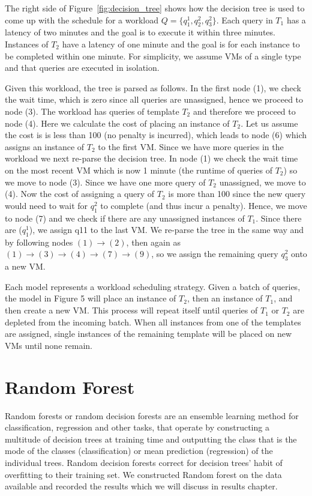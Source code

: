 The right side of Figure~\ref{fig:decision_tree} shows how the decision tree is used to come up with the schedule for a workload \(Q = \{q^1_1, q^2_2, q^2_3\}\). Each query in \(T_1\) has a latency of two minutes and the goal is to execute it within three minutes. Instances of \(T_2\) have a latency of one minute and the goal is for each instance to be completed within one minute. For simplicity, we assume VMs of a single type and that queries are executed in isolation. 

Given this workload, the tree is parsed as follows. In the first node (1), we check the wait time, which is zero since all queries are unassigned, hence we proceed to node (3). The workload has queries of template \(T_2\) and therefore we proceed to node (4). Here we calculate the cost of placing an instance of \(T_2\). Let us assume the cost is is less than 100 (no penalty is incurred), which leads to node (6) which assigns an instance of \(T_2\) to the first VM. Since we have more queries in the workload we next re-parse the decision tree. In node (1) we check the wait time on the most recent VM which is now 1 minute (the runtime of queries of \(T_2\)) so we move to node (3). Since we have one more query of \(T_2\) unassigned, we move to (4). Now the cost of assigning a query of \(T_2\) is more than 100 since the new query would need to wait for \(q^2_1\) to complete (and thus incur a penalty). Hence, we move to node (7) and we check if there are any unassigned instances of \(T_1\). Since there are (\(q^1_1\)), we assign q11 to the last VM. We re-parse the tree in the same way and by following nodes \((1)\to(2)\), then again as \((1)\to(3)\to(4)\to(7)\to(9)\), so we assign the remaining query \(q^2_3\) onto a new VM. 

Each model represents a workload scheduling strategy. Given a batch of queries, the model in Figure 5 will place an instance of \(T_2\), then an instance of \(T_1\), and then create a new VM. This process will repeat itself until queries of \(T_1\) or \(T_2\) are depleted from the incoming batch. When all instances from one of the templates are assigned, single instances of the remaining template will be placed on new VMs until none remain.

\section{Random Forest}
Random forests \cite{liaw2002classification} or random decision forests are an ensemble learning method for classification, regression and other tasks, that operate by constructing a multitude of decision trees at training time and outputting the class that is the mode of the classes (classification) or mean prediction (regression) of the individual trees. Random decision forests correct for decision trees' habit of overfitting to their training set. We constructed Random forest on the data available and recorded the results which we will discuss in results chapter.

